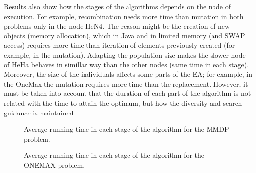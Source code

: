 Results also show how the stages of the algorithms depends on the node of execution. For example, recombination needs more time than mutation in both problems only in the node HeN4. The reason might be the creation of new objects (memory allocation), which in Java and in limited memory (and SWAP access) requires more time than iteration of elements previously created (for example, in the mutation). Adapting the population size makes the slower node of HeHa behaves in simillar way than the other nodes (same time in each stage). Moreover, the size of the individuals affects some parts of the EA; for example, in the OneMax the mutation requires more time than the replacement. However, it must be taken into account that the duration of each part of the algorithm is not related with the time to attain the optimum, but how the diversity and search guidance is maintained. 

\begin{figure*}
\centering
{}
\caption{Average running time in each stage of the algorithm for the MMDP problem.}
\label{fig:MMDPbars}
\end{figure*}

\begin{figure*}
\centering
{}
\caption{Average running time in each stage of the algorithm for the ONEMAX problem.}
\label{fig:ONEMAXbars}
\end{figure*}


